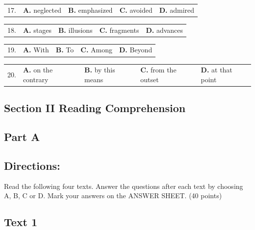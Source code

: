 \documentclass[UTF8,11pt]{ctexart}
\begin{document}
\noindent\begin{tabularx}{\linewidth}{@{}lXXXX@{}}17. & \textbf{A.} neglected & \textbf{B.} emphasized & \textbf{C.} avoided & \textbf{D.} admired\\\end{tabularx}\par

\noindent\begin{tabularx}{\linewidth}{@{}lXXXX@{}}18. & \textbf{A.} stages & \textbf{B.} illusions & \textbf{C.} fragments & \textbf{D.} advances\\\end{tabularx}\par

\noindent\begin{tabularx}{\linewidth}{@{}lXXXX@{}}19. & \textbf{A.} With & \textbf{B.} To & \textbf{C.} Among & \textbf{D.} Beyond\\\end{tabularx}\par

\noindent\begin{tabularx}{\linewidth}{@{}lXXXX@{}}20. & \textbf{A.} on the contrary & \textbf{B.} by this means & \textbf{C.} from the outset & \textbf{D.} at that point\\\end{tabularx}\par

\subsection*{\textbf{Section II Reading Comprehension}}


\subsection*{\textbf{Part A}}


\subsection*{\textbf{Directions:}}


Read the following four texts. Answer the questions after each text by choosing A, B, C or D. Mark your answers on the ANSWER SHEET. (40 points)


\subsection*{\textbf{Text 1}}
\end{document}
